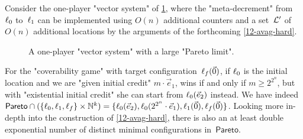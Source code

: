 \begin{example}\label{12-ex-pareto}
  Consider the one-player "vector system" of \cref{12-fig-pareto},
  where the "meta-decrement" from~$\ell_0$ to~$\ell_1$ can be
  implemented using $O(n)$ additional counters and a set~$\mathcal L'$ of
  $O(n)$ additional locations by the arguments of the
  forthcoming \cref{12-avag-hard}.
  
  \begin{figure}[htbp]
    \centering
  \caption{\label{12-fig-pareto} A one-player "vector system"
  with a large "Pareto limit".}
  \end{figure}
  For the "coverability game" with target
  configuration~$\ell_f(\vec 0)$, if $\ell_0$ is the initial location
  and we are "given initial credit" $m\cdot\vec e_1$, \Eve wins if and
  only if $m\geq 2^{2^n}$, but with "existential initial credit" she
  can start from $\ell_0(\vec e_2)$ instead.  We have indeed
  $\mathsf{Pareto}\cap(\{\ell_0,\ell_1,\ell_f\}\times\mathbb N^k)=\{\ell_0(\vec
  e_2),\ell_0(2^{2^n}\cdot\vec e_1),\ell_1(\vec 0),\ell_f(\vec 0)\}$.
  Looking more in-depth into the construction of \cref{12-avag-hard},
  there is also an at least double exponential number of distinct
  minimal configurations in~$\mathsf{Pareto}$.
\end{example}



